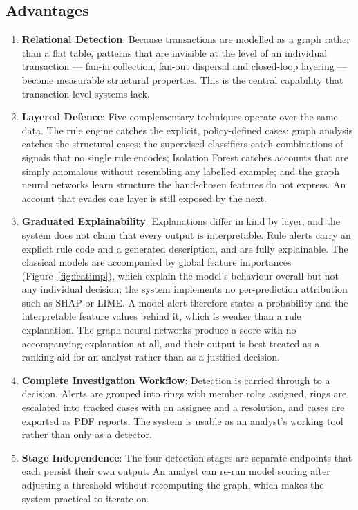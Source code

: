 \subsection{Advantages}\label{sec:advantages}
\begin{enumerate}
  \item \textbf{Relational Detection}: Because transactions are modelled as a graph rather than a flat table, patterns that are invisible at the level of an individual transaction --- fan-in collection, fan-out dispersal and closed-loop layering --- become measurable structural properties. This is the central capability that transaction-level systems lack.
  \item \textbf{Layered Defence}: Five complementary techniques operate over the same data. The rule engine catches the explicit, policy-defined cases; graph analysis catches the structural cases; the supervised classifiers catch combinations of signals that no single rule encodes; Isolation Forest catches accounts that are simply anomalous without resembling any labelled example; and the graph neural networks learn structure the hand-chosen features do not express. An account that evades one layer is still exposed by the next.
  \item \textbf{Graduated Explainability}: Explanations differ in kind by layer, and the system does not claim that every output is interpretable. Rule alerts carry an explicit rule code and a generated description, and are fully explainable. The classical models are accompanied by global feature importances (Figure~\ref{fig:featimp}), which explain the model's behaviour overall but not any individual decision; the system implements no per-prediction attribution such as SHAP or LIME. A model alert therefore states a probability and the interpretable feature values behind it, which is weaker than a rule explanation. The graph neural networks produce a score with no accompanying explanation at all, and their output is best treated as a ranking aid for an analyst rather than as a justified decision.
  \item \textbf{Complete Investigation Workflow}: Detection is carried through to a decision. Alerts are grouped into rings with member roles assigned, rings are escalated into tracked cases with an assignee and a resolution, and cases are exported as PDF reports. The system is usable as an analyst's working tool rather than only as a detector.
  \item \textbf{Stage Independence}: The four detection stages are separate endpoints that each persist their own output. An analyst can re-run model scoring after adjusting a threshold without recomputing the graph, which makes the system practical to iterate on.

\end{enumerate}
